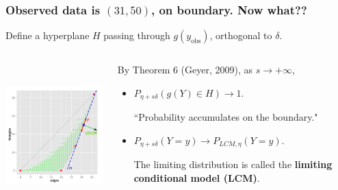 \documentclass[ 10pt]{beamer}
\newcommand{\yobs}{y_{\text{obs}}}
\begin{document}
\frame
{
	\frametitle{Observed data is $(31,50)$, on boundary.  Now what??}

Define a hyperplane $H$ passing through $g(\yobs)$, orthogonal to $\delta$.
\begin{columns}[]
\begin{column}[T]{0.45\textwidth}
\includegraphics[height=2.2in]{g9-H.png}
\end{column}
\begin{column}[t]{0.57\textwidth}

\pause
By Theorem 6 (Geyer, 2009), as $s \to +\infty$,
\vspace{1mm}
\begin{itemize}
\item $P_{\eta + s \delta}( g(Y) \in H) \to 1.$
\vspace{1mm}

``Probability accumulates on the boundary."
\vspace{3mm}

\pause
\item $P_{\eta + s \delta}( Y = y) \to P_{LCM, \eta}( Y = y)$.
\vspace{1mm}

The limiting distribution is called the \textbf{limiting conditional model (LCM)}.
\end{itemize}
\end{column}
\end{columns}
}
\end{document}
